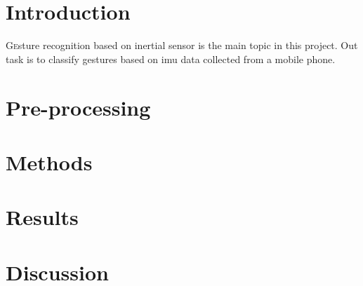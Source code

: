 \documentclass[twoside]{article}
\begin{document}
\begin{multicols}{2} %

\section{Introduction}
\lettrine[nindent=0em,lines=2]{G}esture recognition based on inertial sensor is the main topic in this project. Out task is to classify gestures based on imu data collected from a mobile phone.


\section{Pre-processing}

\section{Methods}


\section{Results}

\section{Discussion}


\begin{thebibliography}{2} %


\end{thebibliography}
\end{multicols}
\end{document}
